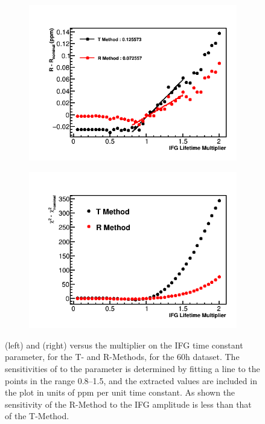 \begin{figure}[h]
\centering
    \begin{subfigure}[t]{0.45\textwidth}
        \centering
        \includegraphics[width=\textwidth]{IFG_Lifetime_Compare_R}
    \end{subfigure}%
    \hspace{1cm}
    \begin{subfigure}[t]{0.45\textwidth}
        \centering
        \includegraphics[width=\textwidth]{IFG_Lifetime_Compare_Chisq}
    \end{subfigure}
\caption[]{\R (left) and \chisq (right) versus the multiplier on the IFG time constant parameter, for the T- and R-Methods, for the 60h dataset. The sensitivities of \R to the parameter is determined by fitting a line to the points in the range 0.8--1.5, and the extracted values are included in the plot in units of ppm per unit time constant. As shown the sensitivity of the R-Method to the IFG amplitude is less than that of the T-Method.}
\label{fig:IFGtauscan}
\end{figure}


